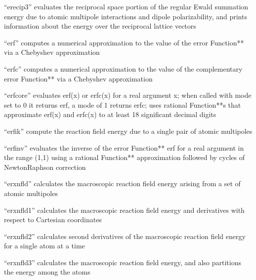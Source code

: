 \documentclass[letterpaper,11pt,english]{sphinxmanual}
\begin{document}

“erecip3” evaluates the reciprocal space portion of the regular Ewald summation energy due to atomic multipole interactions and dipole polarizability, and prints information about the energy over the reciprocal lattice vectors


“erf” computes a numerical approximation to the value of the error Function** via a Chebyshev approximation


“erfc” computes a numerical approximation to the value of the complementary error Function** via a Chebyshev approximation


“erfcore” evaluates erf(x) or erfc(x) for a real argument x; when called with mode set to 0 it returns erf, a mode of 1 returns erfc; uses rational Function**s that approximate erf(x) and erfc(x) to at least 18 significant decimal digits


“erfik” compute the reaction field energy due to a single pair of atomic multipoles


“erfinv” evaluates the inverse of the error Function** erf for a real argument in the range (\sphinxhyphen{}1,1) using a rational Function** approximation followed by cycles of Newton\sphinxhyphen{}Raphson correction


“erxnfld” calculates the macroscopic reaction field energy arising from a set of atomic multipoles


“erxnfld1” calculates the macroscopic reaction field energy and derivatives with respect to Cartesian coordinates


“erxnfld2” calculates second derivatives of the macroscopic reaction field energy for a single atom at a time


“erxnfld3” calculates the macroscopic reaction field energy, and also partitions the energy among the atoms
\end{document}

